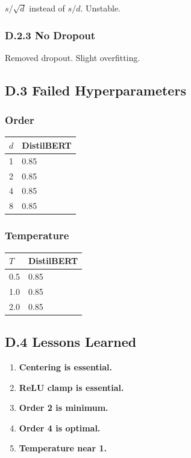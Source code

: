 $s / \sqrt{d}$ instead of $s / d$. Unstable.

\subsubsection{D.2.3 No Dropout}

Removed dropout. Slight overfitting.

\subsection{D.3 Failed Hyperparameters}

\subsubsection{Order}

\begin{table}[H]
\centering
\small
\begin{tabular}{ll}
\toprule
\textbf{$d$} & \textbf{DistilBERT} \\
\midrule
1 & 0.85 \\
2 & 0.85 \\
4 & 0.85 \\
8 & 0.85 \\
\bottomrule
\end{tabular}
\end{table}

\subsubsection{Temperature}

\begin{table}[H]
\centering
\small
\begin{tabular}{ll}
\toprule
\textbf{$T$} & \textbf{DistilBERT} \\
\midrule
0.5 & 0.85 \\
1.0 & 0.85 \\
2.0 & 0.85 \\
\bottomrule
\end{tabular}
\end{table}

\subsection{D.4 Lessons Learned}

\begin{enumerate}
\item \textbf{Centering is essential.}
\item \textbf{ReLU clamp is essential.}
\item \textbf{Order 2 is minimum.}
\item \textbf{Order 4 is optimal.}
\item \textbf{Temperature near 1.}

\end{enumerate}


